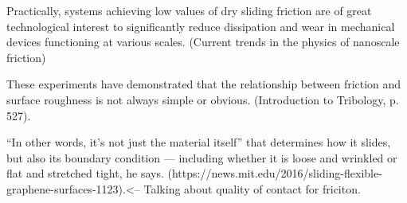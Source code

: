 Practically, systems achieving low values of dry sliding friction are of great technological interest to significantly reduce dissipation and wear in mechanical devices functioning at various scales. (Current trends in the physics of nanoscale friction)

These experiments have demonstrated that the relationship between friction and surface roughness is not always simple or obvious. (Introduction to Tribology, p. 527).


“In other words, it’s not just the material itself” that determines how it slides, but also its boundary condition — including whether it is loose and wrinkled or flat and stretched tight, he says. (https://news.mit.edu/2016/sliding-flexible-graphene-surfaces-1123).<-- Talking about quality of contact for friciton.